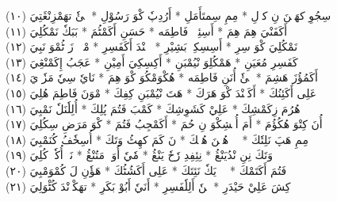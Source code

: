 \documentclass[a4paper, 10pt]{report}
\begin{document}
\begin{center}
\textarabic{(١٠) \textcolor{mygreen}{سِجُوِ كهَنٖنَ نِ كوٖلِ  * مِمِ سِمتَأَمَلِ  * أَرُدِپٗ كْوَ رَسُوْلِ  * يٖئٗ تهَمْزِنْڠَتِيَ }} 
\\[5mm] 

\textarabic{(١١) \textcolor{mygreen}{أَكَفَنْيَ هِمَ هِمَ  * أَسِئِوٖزٖ فَاطِمَه  * حَسَنِ أَكَمْٹُمَ  * بَبَكٗ نَمْكُلِيَ }} 
\\[5mm] 

\textarabic{(١٢) \textcolor{mygreen}{نَمْكُلِيَ كْوَ سِرِ  * أَسِسِكِيٖ بَشِيْرِ  * كٖنٖنْدَ أَكَفَسِرِ  * مْبٖلٖ زَ ٹُمْوَ نَبِيَ }} 
\\[5mm] 

\textarabic{(١٣) \textcolor{mygreen}{كَفَسِرِ مُعَيَنِ  * هَمْكُلِوَ نْيُمْبَنِ  * أَكِسِكِيَ أَمِيْنِ  * عَجَبُ إِكَمْنْڠِيَ }} 
\\[5mm] 

\textarabic{(١٤) \textcolor{mygreen}{أَكَمُؤُزَ هَشِمَ  * يٖئٗ أُنَنِ فَاطِمَه  * هُكْوَمْكُوَ كْوَ هِمَ  * نَايٗ سِيٗ مَزٗوٖيَ }} 
\\[5mm] 

\textarabic{(١٥) \textcolor{mygreen}{عَلِى أَكَئِنُكَ  * أَكَنٖنْدَ كْوَ هَرَكَ  * هَتَ نْيُمْبَنِ كِفِكَ  * مْوَنَ فَاطِمَ هُلِيَ }} 
\\[5mm] 

\textarabic{(١٦) \textcolor{mygreen}{هُرُمَ زِكَمْشِكَ  * عَلِيْ كَشَوِشِكَ  * كَمْبَ فَتُمَ پُلِكَ  * أُلِلٗنَلٗ نَمْبِيَ }} 
\\[5mm] 

\textarabic{(١٧) \textcolor{mygreen}{أُنَ كِتْوَ هُكُؤُمَ  * أَمَ أُمٖشِكْوَ نِ حُمَ  * أَكَمْجِبُ فَتُمَ  * كْوَ مَرَضِ سِكُلِيَ }} 
\\[5mm] 

\textarabic{(١٨) \textcolor{mygreen}{مِمِ هَپَ نَلِتٗكَ  * وٖوٖ هُنٖنَ هُتٖكَ  * نَ كَمَ كهِٹُ وَتَكَ  * أُسِخٗفُ كُنَمْبِيَ }} 
\\[5mm] 

\textarabic{(١٩) \textcolor{mygreen}{وَتَكَ نِنِ نْدُيَنْڠُ  * نِئِفِدِ رٗحٗ يَنْڠُ  * مٗيٗ أُوَتٖ مَتُنْڠُ  * نَوٖ أُكٗمٖ كُلِيَ }} 
\\[5mm] 

\textarabic{(٢٠) \textcolor{mygreen}{فَتُمَ أَكَتَمْكَ  * پٖٹٖ يَكٗ نَئِتَكَ  * عَلِى أَكَشُٹُكَ  * هَؤٗنِ لَ كُمْوَمْبِيَ }} 
\\[5mm] 

\textarabic{(٢١) \textcolor{mygreen}{كِشَ عَلِيْ حَيْدَرِ  * نٖنٗ أَلِلٗفَسِرِ  * أَنَيٗ أَبُوْ بَكَرِ  * تهَكْوٖنْدَ كُٹْوَلِيَ }} 
\\[5mm] 


\end{center}
\end{document}
